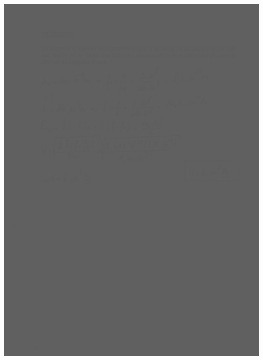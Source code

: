 {{{\includegraphics[width=17.498cm,height=24.13cm]{Pictures/10000001000002570000033B115B7FCA5E9F77EB.png}

}}}
